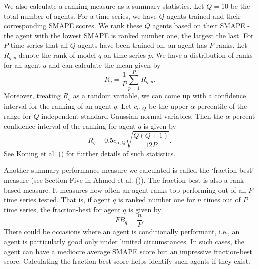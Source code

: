 We also calculate a ranking measure as a summary statistics. Let $Q=10$ be the total number of agents. For a time series, we have $Q$ agents trained and their corresponding SMAPE scores. We rank these $Q$ agents based on their SMAPE - the agent with the lowest SMAPE is ranked number one, the largest the last. For $P$ time series that all $Q$ agents have been trained on, an agent has $P$ ranks. Let $R_{q, p}$ denote the rank of model $q$ on time series $p$. We have a distribution of ranks for an agent $q$ and can calculate the mean given by
\begin{equation*}\label{eq: rank}
    R_q = \frac{1}{P} \sum_{p = 1}^{P}R_{q, p}.
\end{equation*}
Moreover, treating $R_q$ as a random variable, we can come up with a confidence interval for the ranking of an agent $q$. Let $c_{\alpha, Q}$ be the upper $\alpha$ percentile of the range for $Q$ independent standard Gaussian normal variables. Then the $\alpha$ percent confidence interval of the ranking for agent $q$ is given by
\begin{equation*}\label{eq: rank interval}
    R_q \pm 0.5 c_{\alpha, Q} \sqrt{\frac{Q(Q+1)}{12 P}}.
\end{equation*}
See Koning et al. (\citeyear{KONING2005397}) for further details of such statistics.

Another summary performance measure we calculated is called the `fraction-best' measure (see Section Five in Ahmed et al. (\citeyear{2010EmpiricalMLComparison})). The fraction-best is also a rank-based measure. It measures how often an agent ranks top-performing out of all $P$ time series tested. That is, if agent $q$ is ranked number one for $n$ times out of $P$ time series, the fraction-best for agent $q$ is given by
\begin{equation*}\label{eq: frac best}
    FB_q = \frac{n}{P}.
\end{equation*}
There could be occasions where an agent is conditionally performant, i.e., an agent is particularly good only under limited circumstances. In such cases, the agent can have a mediocre average SMAPE score but an impressive fraction-best score. Calculating the fraction-best score helps identify such agents if they exist.

